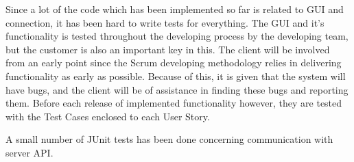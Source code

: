 Since a lot of the code which has been implemented so far is related to GUI and connection, it has been hard to write tests for everything.
The GUI and it's functionality is tested throughout the developing process by the developing team, but the customer is also an important key in this.
The client will be involved from an early point since the Scrum developing methodology relies in delivering functionality as early as possible. Because of this, it is given that the system will have bugs, and the client will be of assistance in finding these bugs and reporting them. Before each release of implemented functionality however, they are tested with the Test Cases enclosed to each User Story.

A small number of JUnit tests has been done concerning communication with server API.

\FloatBarrier
